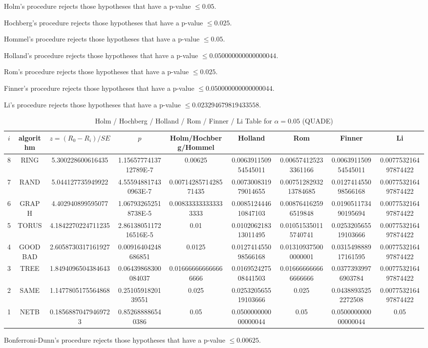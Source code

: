 \documentclass[a4paper,10pt]{article}
\begin{document}
\begin{landscape}
Holm's procedure rejects those hypotheses that have a p-value $\le0.05$.


Hochberg's procedure rejects those hypotheses that have a p-value $\le0.025$.


Hommel's procedure rejects those hypotheses that have a p-value $\le0.05$.


Holland's procedure rejects those hypotheses that have a p-value $\le0.050000000000000044$.


Rom's procedure rejects those hypotheses that have a p-value $\le0.025$.


Finner's procedure rejects those hypotheses that have a p-value $\le0.050000000000000044$.


Li's procedure rejects those hypotheses that have a p-value $\le0.023294679819433558$.



\newpage

\begin{table}[!htp]
\centering\scriptsize
\caption{Holm / Hochberg / Holland / Rom / Finner / Li Table for $\alpha=0.05$ (QUADE)}
\begin{tabular}{ccccccccc}
$i$&algorithm&$z=(R_0 - R_i)/SE$&$p$&Holm/Hochberg/Hommel&Holland&Rom&Finner&Li\\
\hline
8& RING&5.300228600616435&1.1565777413712789E-7&0.00625&0.006391150954545011&0.006574125233361166&0.006391150954545011&0.007753216497874422\\
7& RAND&5.044127735949922&4.555948817430963E-7&0.0071428571428571435&0.007300831979014655&0.0075128293213784685&0.012741455098566168&0.007753216497874422\\
6& GRAPH&4.402940899595077&1.067932652518738E-5&0.008333333333333333&0.008512444610847103&0.008764162596519848&0.019051173490195694&0.007753216497874422\\
5& TORUS&4.1842270224711235&2.8613805117216516E-5&0.01&0.010206218313011495&0.010515350115740741&0.025320565519103666&0.007753216497874422\\
4& GOODBAD&2.6058730317161927&0.00916404248686851&0.0125&0.012741455098566168&0.013109375000000001&0.031549888917161595&0.007753216497874422\\
3& TREE&1.8494096504384643&0.06439868300084037&0.016666666666666666&0.016952427508441503&0.016666666666666666&0.03773939976903784&0.007753216497874422\\
2& SAME&1.1477805175564868&0.2510591820139551&0.025&0.025320565519103666&0.025&0.04388935252272508&0.007753216497874422\\
1& NETB&0.18568870479469723&0.852688886540386&0.05&0.050000000000000044&0.05&0.050000000000000044&0.05\\
\hline
\end{tabular}
\end{table}
Bonferroni-Dunn's procedure rejects those hypotheses that have a p-value $\le0.00625$.



\end{landscape}
\end{document}
